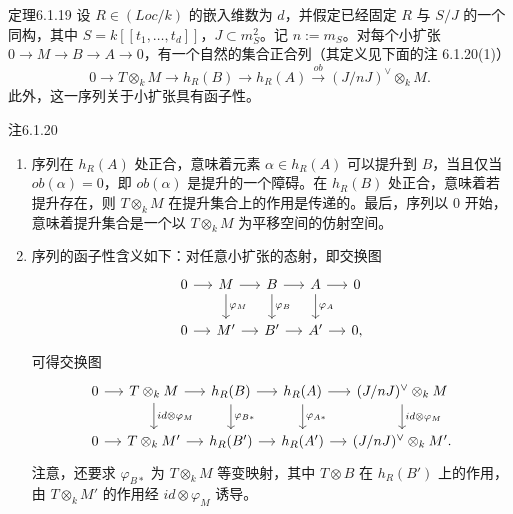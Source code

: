 \begin{origstatement}{定理}{6.1.19}\label{ch06:6.1.19}
设 $R\in(Loc/k)$ 的嵌入维数为 $d$，并假定已经固定 $R$ 与 $S/J$ 的一个同构，其中 $S=k[[t_1,\ldots,t_d]]$，$J\subset m_S^2$。记 $n:=m_S$。对每个小扩张 $0\to M\to B\to A\to0$，有一个自然的集合正合列（其定义见下面的注 6.1.20(1)）
\[
0\longrightarrow T\otimes_k M\longrightarrow h_R(B)
\longrightarrow h_R(A)\xrightarrow{ob}(J/nJ)^\vee\otimes_k M.
\]
此外，这一序列关于小扩张具有函子性。
\end{origstatement}
\begin{origstatement}{注}{6.1.20}\label{ch06:6.1.20}
\begin{enumerate}[label=(\arabic*)]
\item 序列在 $h_R(A)$ 处正合，意味着元素 $\alpha\in h_R(A)$ 可以提升到 $B$，当且仅当 $ob(\alpha)=0$，即 $ob(\alpha)$ 是提升的一个障碍。在 $h_R(B)$ 处正合，意味着若提升存在，则 $T\otimes_k M$ 在提升集合上的作用是传递的。最后，序列以 $0$ 开始，意味着提升集合是一个以 $T\otimes_k M$ 为平移空间的仿射空间。
\item 序列的函子性含义如下：对任意小扩张的态射，即交换图
\[
\begin{tikzcd}[column sep=small]
0\arrow[r]&M\arrow[r]\arrow[d,"\varphi_M"]&B\arrow[r]\arrow[d,"\varphi_B"]&A\arrow[r]\arrow[d,"\varphi_A"]&0\\
0\arrow[r]&M'\arrow[r]&B'\arrow[r]&A'\arrow[r]&0,
\end{tikzcd}
\]
可得交换图
\[
\begin{tikzcd}[column sep=small]
0\arrow[r]&T\otimes_k M\arrow[r]\arrow[d,"id\otimes\varphi_M"]&h_R(B)\arrow[r]\arrow[d,"\varphi_{B*}"]&h_R(A)\arrow[r]\arrow[d,"\varphi_{A*}"]&(J/nJ)^\vee\otimes_k M\arrow[d,"id\otimes\varphi_M"]\\
0\arrow[r]&T\otimes_k M'\arrow[r]&h_R(B')\arrow[r]&h_R(A')\arrow[r]&(J/nJ)^\vee\otimes_k M'.
\end{tikzcd}
\]
注意，还要求 $\varphi_{B*}$ 为 $T\otimes_k M$ 等变映射，其中 $T\otimes B$ 在 $h_R(B')$ 上的作用，由 $T\otimes_k M'$ 的作用经 $id\otimes\varphi_M$ 诱导。
\end{enumerate}
\end{origstatement}

